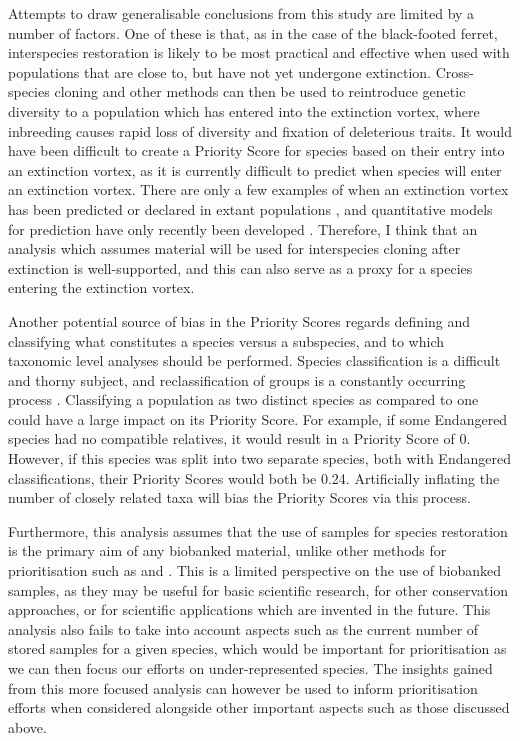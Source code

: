 \documentclass[12pt]{article}
\begin{document}
	Attempts to draw generalisable conclusions from this study are limited by a
	number of factors. One of these is that, as in the case of the black-footed
	ferret, interspecies restoration is likely to be most practical and
	effective when used with populations that are close to, but have not yet
	undergone extinction. Cross-species cloning and other methods can then be
	used to reintroduce genetic diversity to a population which has entered into
	the extinction vortex, where inbreeding causes rapid loss of diversity and
	fixation of deleterious traits. It would have been difficult to create a
	Priority Score for species based on their entry into an extinction vortex, as
	it is currently difficult to predict when species
	will enter an extinction vortex. There are only a few examples of when an
	extinction vortex has been predicted or declared
	in extant populations \citep{williamsextinctionvortex2020}, and quantitative
	models for prediction have only recently been developed
	\citep{nabutanyiModelsEcoEvolutionaryExtinction2021}. Therefore, I think that
	an analysis which assumes material will be used for interspecies
	cloning after extinction
	is well-supported, and
	this can also serve as a proxy for a species entering the extinction
	vortex.
	
	Another potential source of bias in the Priority Scores regards defining and
	classifying what constitutes a species versus a subspecies, and to which
	taxonomic level analyses should be performed.
	Species classification is a difficult and thorny subject, and reclassification
	of groups is a constantly occurring process
	\citep{sangsterApplicationSpeciesCriteria2014}.
	Classifying a population as two distinct species as compared to one could have
	a large impact on its Priority Score. For example, if some Endangered species
	had no compatible relatives, it would result in a Priority Score of 0.
	However, if this species was split into two separate species, both with
	Endangered classifications, their Priority Scores would both be 0.24.
	Artificially inflating the
	number of closely related taxa will bias the Priority Scores via this
	process.
	
	Furthermore, this analysis assumes that the use of samples for species
	restoration is the primary aim of any biobanked material, unlike other
	methods for prioritisation such as
	\citet{harwoodDevelopingImplementingPrioritisation2021}
	and \citet{mooneyValueExSitu2021}.
	This is a limited perspective on the use of biobanked samples, as they may be
	useful for basic scientific research, for other conservation approaches, or
	for scientific applications which are invented in the future. This
	analysis also fails to take into account aspects such as the current number
	of stored samples for a given species, which would be important for
	prioritisation as we can then focus our efforts on under-represented species.
	The insights gained from this more focused analysis can however be used
	to inform prioritisation efforts when considered alongside other important
	aspects such as those discussed above.
	
\end{document}
